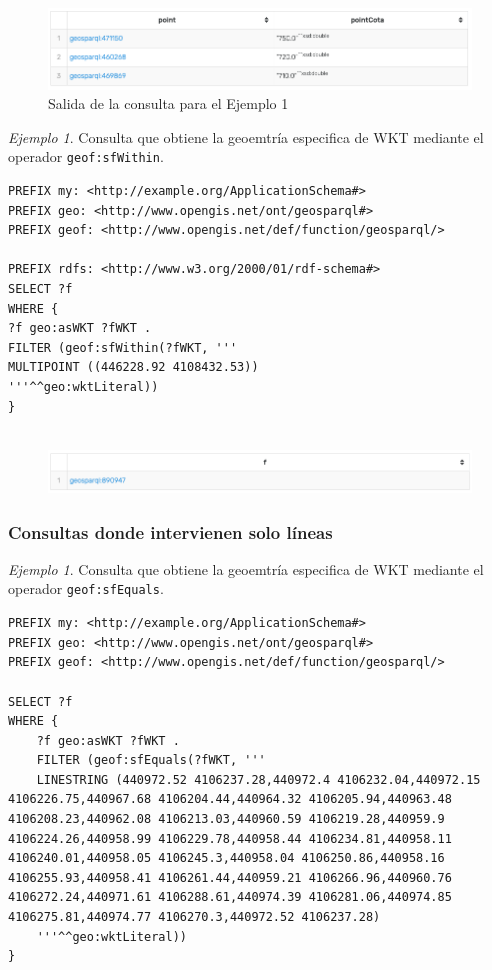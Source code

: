 \begin{figure}[H]
	\centering
	\includegraphics[width=0.9\linewidth]{imagenes/capitulo5/salida5}
	\caption{Salida de la consulta para el Ejemplo 1}
	\label{fig:salida5}
\end{figure}


\textit{Ejemplo 1}. Consulta que obtiene la geoemtría especifica de WKT mediante el operador \texttt{geof:sfWithin}.\\

\begin{lstlisting}
PREFIX my: <http://example.org/ApplicationSchema#>
PREFIX geo: <http://www.opengis.net/ont/geosparql#>
PREFIX geof: <http://www.opengis.net/def/function/geosparql/>

PREFIX rdfs: <http://www.w3.org/2000/01/rdf-schema#>
SELECT ?f
WHERE {
?f geo:asWKT ?fWKT .
FILTER (geof:sfWithin(?fWKT, '''
MULTIPOINT ((446228.92 4108432.53))
'''^^geo:wktLiteral))
} 


\end{lstlisting}

\begin{figure}[H]
	\centering
	\includegraphics[width=0.9\linewidth]{imagenes/capitulo5/salida7}
	\caption{}
	\label{fig:salida7}
\end{figure}

\subsubsection{Consultas donde intervienen solo líneas}

\textit{Ejemplo 1}. Consulta que obtiene la geoemtría especifica de WKT mediante el operador \texttt{geof:sfEquals}.\\

\begin{lstlisting}
PREFIX my: <http://example.org/ApplicationSchema#>
PREFIX geo: <http://www.opengis.net/ont/geosparql#>
PREFIX geof: <http://www.opengis.net/def/function/geosparql/>

SELECT ?f
WHERE {
	?f geo:asWKT ?fWKT .
	FILTER (geof:sfEquals(?fWKT, '''
	LINESTRING (440972.52 4106237.28,440972.4 4106232.04,440972.15 4106226.75,440967.68 4106204.44,440964.32 4106205.94,440963.48 4106208.23,440962.08 4106213.03,440960.59 4106219.28,440959.9 4106224.26,440958.99 4106229.78,440958.44 4106234.81,440958.11 4106240.01,440958.05 4106245.3,440958.04 4106250.86,440958.16 4106255.93,440958.41 4106261.44,440959.21 4106266.96,440960.76 4106272.24,440971.61 4106288.61,440974.39 4106281.06,440974.85 4106275.81,440974.77 4106270.3,440972.52 4106237.28)
	'''^^geo:wktLiteral))
} 
\end{lstlisting}

